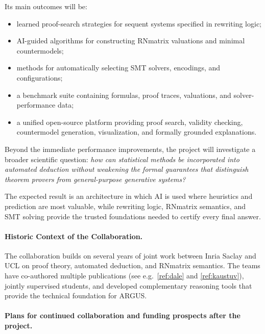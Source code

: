\documentclass[a4paper]{article}
\begin{document}
Its main outcomes will be:
\begin{itemize}[noitemsep]
\item learned proof-search strategies for sequent systems specified in rewriting logic;

\item AI-guided algorithms for constructing RNmatrix valuations and minimal countermodels;

\item methods for automatically selecting SMT solvers, encodings, and configurations;

\item a benchmark suite containing formulas, proof traces, valuations, and solver-performance data;

\item a unified open-source platform providing proof search, validity checking, countermodel generation, visualization, and formally grounded explanations.
\end{itemize}
Beyond the immediate performance improvements, the project will investigate a broader scientific question: {\em how can statistical methods be incorporated into automated deduction without weakening the formal guarantees that distinguish theorem provers from general-purpose generative systems?}

The expected result is an architecture in which AI is used where heuristics and prediction are most valuable, while rewriting logic, RNmatrix semantics, and SMT solving provide the trusted foundations needed to certify every final answer.

\paragraph*{Historic Context of the Collaboration.}
The collaboration builds on several years of joint work between Inria Saclay and UCL on proof theory, automated deduction, and RNmatrix semantics. The teams have co-authored multiple publications (see e.g.~\ref{ref:dale} and \ref{ref:kaustuv}), jointly supervised students, and developed complementary reasoning tools that provide the technical foundation for ARGUS.

\paragraph{Plans for continued collaboration and funding prospects after the project.}

\end{document}
